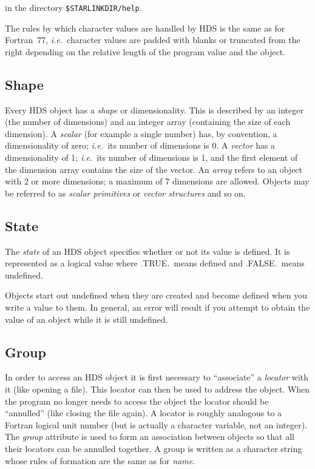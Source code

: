 \documentclass[twoside,11pt]{article}
\newcommand{\htmlref}[2]{#1}
\renewcommand{\_}{\texttt{\symbol{95}}}
\newcommand{\qt}[1]{``#1''}
\newcommand{\st}[1]{{\em{#1}}}
\newcommand{\qt}[1]{{\tt{"}}#1{\tt{"}}}
\begin{document}
in the directory \texttt{\$STARLINK\_DIR/help}.

The rules by which character values are handled by HDS is the same as
for Fortran~77, \st{i.e.}\ character values are padded with blanks or
truncated from the right depending on the relative length of the
program value and the object.

\subsection{\label{sect:shape}Shape}

Every HDS object has a \st{shape} or dimensionality. This is
described by an integer (the number of dimensions) and an integer
array (containing the size of each dimension). A \st{scalar} (for
example a single number) has, by convention, a dimensionality of zero;
\st{i.e.}\ its number of dimensions is 0. A \st{vector} has a
dimensionality of 1; \st{i.e.}\ its number of dimensions is 1, and
the first element of the dimension array contains the size of the
vector.  An \st{array} refers to an object with 2 or more dimensions;
a maximum of 7 dimensions are allowed. Objects may be referred to as
\st{scalar primitives} or \st{vector structures} and so on.

\subsection{State}

The \st{state} of an HDS object specifies whether or not its value is
defined. It is represented as a logical value where .TRUE.\ means
defined and .FALSE.\ means undefined.

Objects start out undefined when they are created and become defined
when you write a value to them. In general, an error will result if
you attempt to obtain the value of an object while it is still
undefined.

\subsection{\label{sect:group}Group}

In order to access an HDS object it is first necessary to
\qt{associate} a \htmlref{\st{locator}}{sect:locators} with it (like
opening a file). This locator can then be used to address the
object. When the program no longer needs to access the object the
locator should be \htmlref{\qt{annulled}}{sect:annul} (like closing
the file again). A locator is roughly analogous to a Fortran logical
unit number (but is actually a character variable, not an
integer). The \st{group} attribute is used to form an association
between objects so that all their locators can be annulled together. A
group is written as a character string whose rules of formation are
the same as for \htmlref{\st{name}}{sect:name}.
\end{document}
